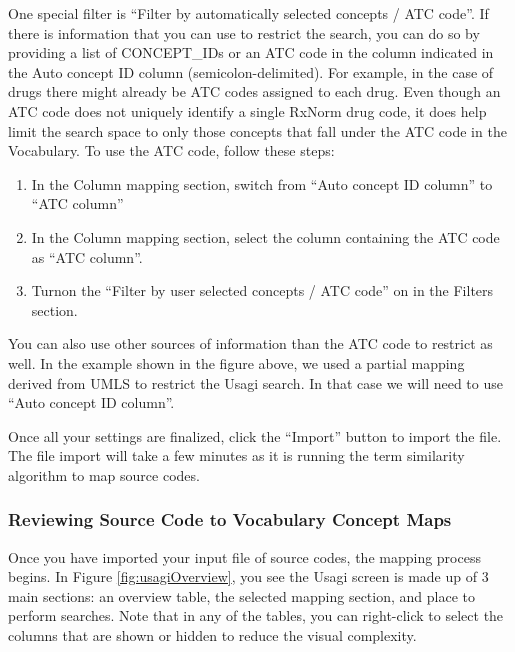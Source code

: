 \documentclass[11pt]{book}
\providecommand{\tightlist}{%
  \setlength{\itemsep}{0pt}\setlength{\parskip}{0pt}}
\theoremstyle{definition}
\theoremstyle{definition}
\theoremstyle{definition}
\theoremstyle{remark}
\begin{document}
One special filter is ``Filter by automatically selected concepts / ATC
code''. If there is information that you can use to restrict the search,
you can do so by providing a list of CONCEPT\_IDs or an ATC code in the
column indicated in the Auto concept ID column (semicolon-delimited).
For example, in the case of drugs there might already be ATC codes
assigned to each drug. Even though an ATC code does not uniquely
identify a single RxNorm drug code, it does help limit the search space
to only those concepts that fall under the ATC code in the Vocabulary.
To use the ATC code, follow these steps:

\begin{enumerate}
\def\labelenumi{\arabic{enumi}.}
\tightlist
\item
  In the Column mapping section, switch from ``Auto concept ID column''
  to ``ATC column''
\item
  In the Column mapping section, select the column containing the ATC
  code as ``ATC column''.
\item
  Turnon the ``Filter by user selected concepts / ATC code'' on in the
  Filters section.
\end{enumerate}

You can also use other sources of information than the ATC code to
restrict as well. In the example shown in the figure above, we used a
partial mapping derived from UMLS to restrict the Usagi search. In that
case we will need to use ``Auto concept ID column''.

Once all your settings are finalized, click the ``Import'' button to
import the file. The file import will take a few minutes as it is
running the term similarity algorithm to map source codes.

\subsubsection*{Reviewing Source Code to Vocabulary Concept
Maps}\label{reviewing-source-code-to-vocabulary-concept-maps}

Once you have imported your input file of source codes, the mapping
process begins. In Figure \ref{fig:usagiOverview}, you see the Usagi
screen is made up of 3 main sections: an overview table, the selected
mapping section, and place to perform searches. Note that in any of the
tables, you can right-click to select the columns that are shown or
hidden to reduce the visual complexity.
\end{document}
